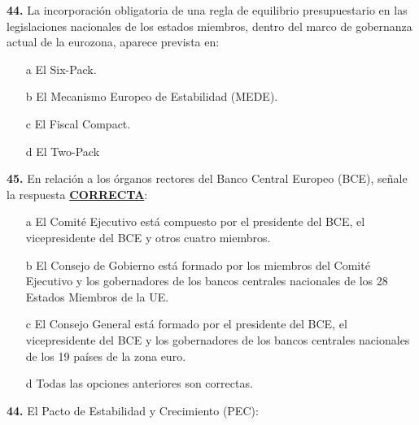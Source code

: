 \documentclass{nuevotema}
\begin{document}
\preguntas


\textbf{44.} La incorporación obligatoria de una regla de equilibrio presupuestario en las legislaciones nacionales de los estados miembros, dentro del marco de gobernanza actual de la eurozona, aparece prevista en:

\begin{itemize}
	\item[a] El Six-Pack.
	\item[b] El Mecanismo Europeo de Estabilidad (MEDE).
	\item[c] El Fiscal Compact.
	\item[d] El Two-Pack
\end{itemize}

\bigskip

\textbf{45.} En relación a los órganos rectores del Banco Central Europeo (BCE), señale la respuesta \textbf{\underline{CORRECTA}}:

\begin{itemize}
	\item[a] El Comité Ejecutivo está compuesto por el presidente del BCE, el vicepresidente del BCE y otros cuatro miembros.
	\item[b] El Consejo de Gobierno está formado por los miembros del Comité Ejecutivo y los gobernadores de los bancos centrales nacionales de los 28 Estados Miembros de la UE.
	\item[c] El Consejo General está formado por el presidente del BCE, el vicepresidente del BCE y los gobernadores de los bancos centrales nacionales de los 19 países de la zona euro.
	\item[d] Todas las opciones anteriores son correctas.
\end{itemize}

\textbf{44.} El Pacto de Estabilidad y Crecimiento (PEC):
\end{document}
